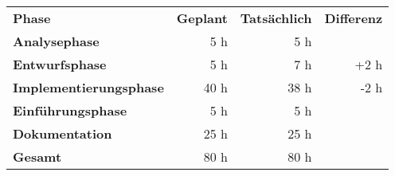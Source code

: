 \begin{tabular}{lrrr}
\rowcolor{heading}\textbf{Phase} & \textbf{Geplant} & \textbf{Tatsächlich} & \textbf{Differenz} \\
\textbf{Analysephase} & 5 h  & 5 h  &  \\
\rowcolor{odd}\textbf{Entwurfsphase} & 5 h   & 7 h  & +2 h \\
\textbf{Implementierungsphase} & 40 h  & 38 h  & -2 h \\
\rowcolor{odd}\textbf{Einführungsphase} & 5 h   & 5 h   &  \\
\textbf{Dokumentation} & 25 h   & 25 h  &   \\
\hline
\hline
\rowcolor{odd}\textbf{Gesamt} & 80 h  & 80 h  &  \\
\end{tabular}
